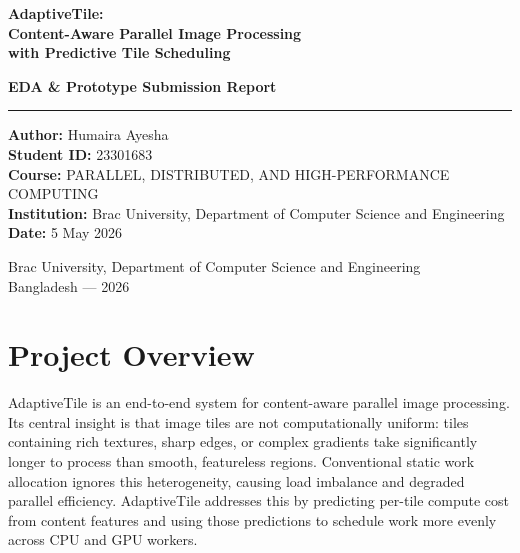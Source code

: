\documentclass[12pt,a4paper]{article}
\begin{document}
\begin{titlepage}
  \centering
  \vspace*{2cm}

  {\LARGE\bfseries\color{black}
    AdaptiveTile:\\[0.3em]
    Content-Aware Parallel Image Processing\\[0.3em]
    with Predictive Tile Scheduling
  \par}

  \vspace{1.5cm}

  {\large\bfseries EDA \& Prototype Submission Report\par}

  \vspace{0.5cm}
  \rule{0.6\textwidth}{0.4pt}
  \vspace{0.5cm}

  {\large
    \textbf{Author:} Humaira Ayesha\\[0.3em]
    \textbf{Student ID:} 23301683\\[0.3em]
    \textbf{Course:} PARALLEL, DISTRIBUTED, AND HIGH-PERFORMANCE COMPUTING\\[0.3em]
    \textbf{Institution:} Brac University, Department of Computer Science and Engineering\\[0.3em]
    \textbf{Date:} 5 May 2026
  \par}

  \vspace{1.5cm}

  \vfill

  {\small Brac University, Department of Computer Science and Engineering\\
    Bangladesh --- 2026}
\end{titlepage}

\thispagestyle{fancy}
\tableofcontents
\newpage

\section{Project Overview}

AdaptiveTile is an end-to-end system for content-aware parallel image processing.
Its central insight is that image tiles are not computationally uniform: tiles containing rich textures, sharp edges, or complex gradients take significantly longer to process than smooth, featureless regions.
Conventional static work allocation ignores this heterogeneity, causing load imbalance and degraded parallel efficiency.
AdaptiveTile addresses this by predicting per-tile compute cost from content features and using those predictions to schedule work more evenly across CPU and GPU workers.
\end{document}
